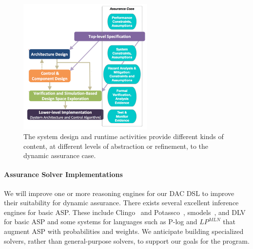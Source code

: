 \begin{figure}
\vspace{-30pt}
\begin{center}
\includegraphics[width=0.6\textwidth,trim={0in 0.2in 0in 0in},clip]{./TA3/dac-sources}
\end{center}
\caption[Assurance case sources]{The system design and runtime activities provide different kinds of content, at different levels of abstraction or refinement, to the dynamic assurance case. }
\label{fig:statemodel}
\vspace{-25pt}
\end{figure}

\paragraph{Assurance Solver Implementations}

We will improve one or more reasoning engines for our DAC DSL to improve their suitability for dynamic assurance.  There exists several excellent inference engines for basic ASP. 
These include Clingo~\cite{clingo} and Potassco~\cite{potassco}, smodels~\cite{smodels}, and DLV for basic ASP and some systems for languages such as P-log and $LP^{MLN}$ that augment ASP with probabilities and weights. We anticipate building specialized solvers, rather than general-purpose solvers, to support our goals for the program. 


